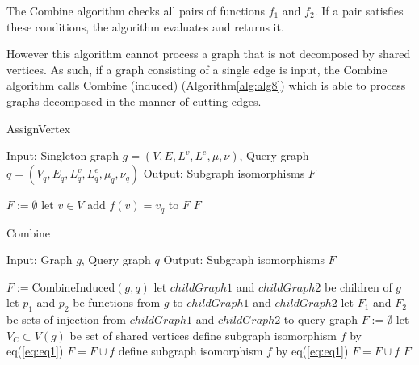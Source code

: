 The Combine algorithm checks all pairs of functions $f_1$ and $f_2$. If a pair satisfies these conditions, the algorithm evaluates and returns it.

However this algorithm cannot process a graph that is not decomposed by shared vertices. As such, if a graph consisting of a single edge
is input, the Combine algorithm calls Combine (induced) (Algorithm\ref{alg:alg8}) which is able to process graphs decomposed in the 
manner of cutting edges.

\begin{algorithm}
\caption{AssignVertex}
\label{alg:alg6}
\begin{algorithmic}
\STATE Input: Singleton graph $g=(V,E,L^v ,L^e ,\mu,\nu)$, Query graph $q=(V_q,E_q,L_q^v ,L_q^e ,\mu_q,\nu_q)$ 
\STATE Output: Subgraph isomorphisms $F$
\end{algorithmic}
\begin{algorithmic}[1]
\STATE $F := \emptyset$
\STATE let $v \in V$
		\STATE add $f(v) = v_q$ to $F$
	\ENDIF
\ENDFOR
\RETURN $F$
\end{algorithmic}
\end{algorithm}

\begin{algorithm}
\caption{Combine}
\label{alg:alg11}
\begin{algorithmic}
\STATE Input: Graph $g$, Query graph $q$
\STATE Output: Subgraph isomorphisms $F$
\end{algorithmic}
\begin{algorithmic}[1]
	\STATE $F := $CombineInduced$(g,q)$
\ELSE
	\STATE let $childGraph1$ and $childGraph2$ be children of $g$
	\STATE let $p_1$ and $p_2$ be functions from $g$ to $childGraph1$ and $childGraph2$
	\STATE let $F_1$ and $F_2$ be sets of injection from $childGraph1$ and $childGraph2$ to query graph
	\STATE $F := \emptyset$
		\STATE let $V_C \subset V(g)$ be set of shared vertices
					\STATE define subgraph isomorphism $f$ by eq(\ref{eq:eq1})
					\STATE $F = F \cup f $
				\ENDIF
			\ENDIF
		\ENDFOR
	\ELSE
				\STATE define subgraph isomorphism $f$ by eq(\ref{eq:eq1})
				\STATE $F = F \cup f $
			\ENDIF
		\ENDFOR
	\ENDIF
\ENDIF
\RETURN $F$
\end{algorithmic}
\end{algorithm}


